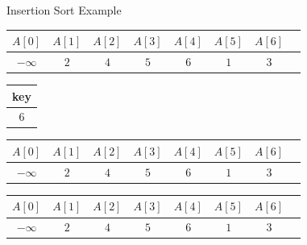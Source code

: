 \begin{frame}{Insertion Sort Example}
\vspace{1cm}
\begin{tabular}{|c|c|c|c|c|c|c|c|}
\hline
$A[0]$ & $A[1]$ & $A[2]$ & $A[3]$ & $A[4]$ & $A[5]$ & $A[6]$\\
\hline
$-\infty$ & $2$ & $4$ & $5$ &\cellcolor{orange} $6$ & $1$ & $3$ \\
\hline
\end{tabular}
\vspace{1cm}
\begin{table}[!hbt]
\begin{tabular}{|c|}
\hline key\\
\hline $6$\\
\hline
\end{tabular}\hspace{1cm}
%
\begin{tabular}{|c|c|c|c|c|c|c|c|}
\hline
$A[0]$ & $A[1]$ & $A[2]$ & $A[3]$ & $A[4]$ & $A[5]$ & $A[6]$\\
\hline
$-\infty$ & $2$ & $4$ & $5$ &\cellcolor{orange} $6$ & $1$ & $3$ \\
\hline
\end{tabular}
\end{table}


\begin{tabular}{|c|c|c|c|c|c|c|c|}
\hline
$A[0]$ & $A[1]$ & $A[2]$ & $A[3]$ & $A[4]$ & $A[5]$ & $A[6]$\\
\hline
$-\infty$ & \cellcolor{statalegreen}$2$ & \cellcolor{statalegreen}$4$ & \cellcolor{statalegreen}$5$ & \cellcolor{statalegreen}$6$ & $1$ & $3$ \\
\hline
\end{tabular}

\end{frame}

